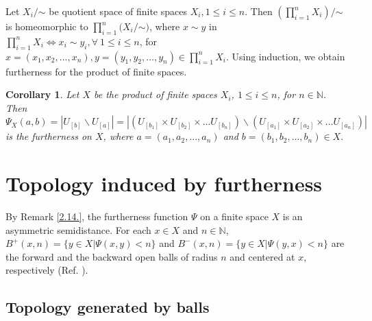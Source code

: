 \documentclass[12pt]{amsart}
\newtheorem{corollary}[definition]{Corollary}
\begin{document}
Let $X_i/$$\sim$ be quotient space of finite spaces $X_i, 1\leq i\leq n$. Then $(\prod_{i=1}^n X_i)/$$\sim$ is homeomorphic to $\prod_{i=1}^n (X_i/$$\sim)$, where $x\sim y$ in  $\prod_{i=1}^n X_i \iff x_i \sim y_i, \forall~ 1\leq i\leq n$, for  $x=(x_1,x_2,...,x_n),y=(y_1,y_2,...,y_n)\in  \prod_{i=1}^n X_i$.
Using induction, we obtain furtherness for the product of finite spaces.

\begin{corollary}   
	
	Let $X$ be the product of finite spaces $X_i$, $1\leq i\leq n$, for $n\in \mathbb{N}$. Then $\Psi_{X}(a,b)= |U_{[b]}\backslash U_{[a]}|= |(U_{[b_1]}\times U_{[b_2]}\times ... U_{[b_n]})\backslash(U_{[a_1]}\times U_{[a_2]}\times ... U_{[a_n]})|$ is the furtherness on $X$, where $a=(a_1,a_2,...,a_n)$ and $b=(b_1,b_2,...,b_n)\in X.$ 
\end{corollary}





\section{\textbf{Topology induced by furtherness}}

By Remark \ref{2.14.}, the furtherness function $\Psi$ on a finite space $X$ is an asymmetric semidistance. For each $x\in X$ and $n\in \mathbb{N}$,  $B^+(x,n)=\{y\in X|\Psi(x,y)<n\}$ and $B^-(x,n)=\{y\in X|\Psi(y,x)<n\}$ are the forward and the backward open balls of radius $n$ and centered at $x$, respectively (Ref. \cite{Mennucci}).

\subsection{\textbf{Topology generated by balls}}
\end{document}
